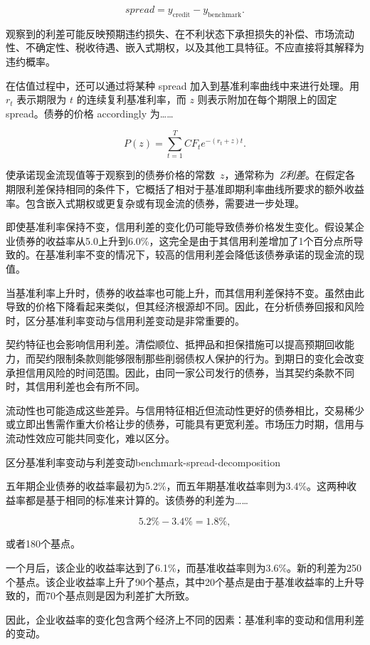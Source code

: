 \begin{equation}
spread
=
y_{\mathrm{credit}}
-
y_{\mathrm{benchmark}}.
\label{eq:ch8-credit-spread}
\end{equation}

观察到的利差可能反映预期违约损失、在不利状态下承担损失的补偿、市场流动性、不确定性、税收待遇、嵌入式期权，以及其他工具特征。不应直接将其解释为违约概率。

在估值过程中，还可以通过将某种 spread 加入到基准利率曲线中来进行处理。用 $r_t$ 表示期限为 $t$ 的连续复利基准利率，而 $z$ 则表示附加在每个期限上的固定 spread。债券的价格 accordingly 为……

\begin{equation}
P(z)
=
\sum_{t=1}^{T}
CF_t e^{-(r_t+z)t}.
\label{eq:ch8-spread-price}
\end{equation}

使承诺现金流现值等于观察到的债券价格的常数~$z$，通常称为~\emph{Z利差}。在假定各期限利差保持相同的条件下，它概括了相对于基准即期利率曲线所要求的额外收益率。包含嵌入式期权或更复杂或有现金流的债券，需要进一步处理。

即使基准利率保持不变，信用利差的变化仍可能导致债券价格发生变化。假设某企业债券的收益率从5.0上升到6.0\%，这完全是由于其信用利差增加了1个百分点所导致的。在基准利率不变的情况下，较高的信用利差会降低该债券承诺的现金流的现值。

当基准利率上升时，债券的收益率也可能上升，而其信用利差保持不变。虽然由此导致的价格下降看起来类似，但其经济根源却不同。因此，在分析债券回报和风险时，区分基准利率变动与信用利差变动是非常重要的。

契约特征也会影响信用利差。清偿顺位、抵押品和担保措施可以提高预期回收能力，而契约限制条款则能够限制那些削弱债权人保护的行为。到期日的变化会改变承担信用风险的时间范围。因此，由同一家公司发行的债券，当其契约条款不同时，其信用利差也会有所不同。

流动性也可能造成这些差异。与信用特征相近但流动性更好的债券相比，交易稀少或立即出售需作重大价格让步的债券，可能具有更宽利差。市场压力时期，信用与流动性效应可能共同变化，难以区分。

\begin{example}{区分基准利率变动与利差变动}{benchmark-spread-decomposition}

五年期企业债券的收益率最初为5.2\%，而五年期基准收益率则为3.4\%。这两种收益率都是基于相同的标准来计算的。该债券的利差为……

\[
5.2\%-3.4\%=1.8\%,
\]

或者180个基点。

一个月后，该企业的收益率达到了6.1\%，而基准收益率则为3.6\%。新的利差为250个基点。该企业收益率上升了90个基点，其中20个基点是由于基准收益率的上升导致的，而70个基点则是因为利差扩大所致。

因此，企业收益率的变化包含两个经济上不同的因素：基准利率的变动和信用利差的变动。

\end{example}

